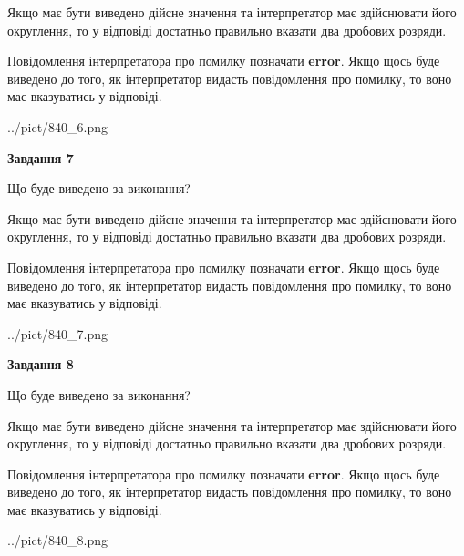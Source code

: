 \documentclass[12pt, ukrainian]{article}
\begin{document}
{\begin {Large}
Якщо має бути виведено дійсне значення та інтерпретатор має здійснювати його округлення, 
то у відповіді достатньо правильно вказати два дробових розряди.

Повідомлення інтерпретатора про помилку позначати \textbf{error}.
Якщо щось буде виведено до того, як інтерпретатор видасть повідомлення про помилку, 
то воно має вказуватись у відповіді. \par

\begin{center}
	{../pict/840_6.png}
\end{center}
\newpage

{\begin {center}\textbf{Завдання 7}\end {center}}\par
Що буде виведено за виконання? \par

Якщо має бути виведено дійсне значення та інтерпретатор має здійснювати його округлення, 
то у відповіді достатньо правильно вказати два дробових розряди.

Повідомлення інтерпретатора про помилку позначати \textbf{error}.
Якщо щось буде виведено до того, як інтерпретатор видасть повідомлення про помилку, 
то воно має вказуватись у відповіді. \par

\begin{center}
	{../pict/840_7.png}
\end{center}
\newpage

{\begin {center}\textbf{Завдання 8}\end {center}}\par
Що буде виведено за виконання? \par

Якщо має бути виведено дійсне значення та інтерпретатор має здійснювати його округлення, 
то у відповіді достатньо правильно вказати два дробових розряди.

Повідомлення інтерпретатора про помилку позначати \textbf{error}.
Якщо щось буде виведено до того, як інтерпретатор видасть повідомлення про помилку, 
то воно має вказуватись у відповіді. \par

\begin{center}
	{../pict/840_8.png}
\end{center}
\newpage


\end{Large}}
\end{document}
